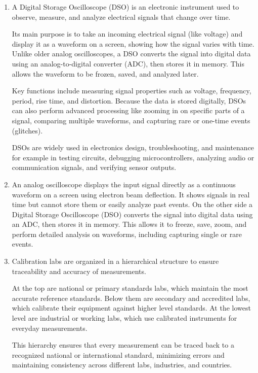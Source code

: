 \documentclass[../main.tex]{subfiles}
\begin{document}
\begin{enumerate}[label=\textbf{\arabic*.}]

	\item A Digital Storage Oscilloscope (DSO) is an electronic instrument used to observe, measure, and analyze electrical signals that change over time. 
	
	Its main purpose is to take an incoming electrical signal (like voltage) and display it as a waveform on a screen, showing how the signal varies with time. Unlike older analog oscilloscopes, a DSO converts the signal into digital data using an analog-to-digital converter (ADC), then stores it in memory. This allows the waveform to be frozen, saved, and analyzed later.
	
	Key functions include measuring signal properties such as voltage, frequency, period, rise time, and distortion. Because the data is stored digitally, DSOs can also perform advanced processing like zooming in on specific parts of a signal, comparing multiple waveforms, and capturing rare or one-time events (glitches).
	
	DSOs are widely used in electronics design, troubleshooting, and maintenance for example in testing circuits, debugging microcontrollers, analyzing audio or communication signals, and verifying sensor outputs.

	\item An analog oscilloscope displays the input signal directly as a continuous waveform on a screen using electron beam deflection. It shows signals in real time but cannot store them or easily analyze past events. On the other side a Digital Storage Oscilloscope (DSO) converts the signal into digital data using an ADC, then stores it in memory. This allows it to freeze, save, zoom, and perform detailed analysis on waveforms, including capturing single or rare events.
	
	\item Calibration labs are organized in a hierarchical structure to ensure traceability and accuracy of measurements.

	At the top are national or primary standards labs, which maintain the most accurate reference standards. Below them are secondary and accredited labs, which calibrate their equipment against higher level standards. At the lowest level are industrial or working labs, which use calibrated instruments for everyday measurements.
	
	This hierarchy ensures that every measurement can be traced back to a recognized national or international standard, minimizing errors and maintaining consistency across different labs, industries, and countries.


\end{enumerate}
\end{document}
